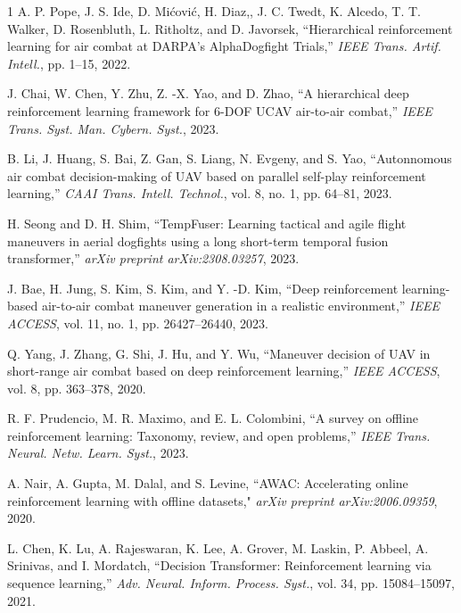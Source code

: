 \begin{thebibliography}{1}
    A. P. Pope, J. S. Ide, D. Mićović, H. Diaz,, J. C. Twedt, K. Alcedo, T. T. Walker, D. Rosenbluth, L. Ritholtz, and D. Javorsek, ``Hierarchical reinforcement learning for air combat at {DARPA}'s {AlphaDogfight Trials},'' \emph{IEEE Trans. Artif. Intell.}, pp. 1--15, 2022.

    J. Chai, W. Chen, Y. Zhu, Z. -X. Yao, and D. Zhao, ``A hierarchical deep reinforcement learning framework for 6-{DOF} {UCAV} air-to-air combat,'' \emph{IEEE Trans. Syst. Man. Cybern. Syst.}, 2023.

    B. Li, J. Huang, S. Bai, Z. Gan, S. Liang, N. Evgeny, and S. Yao, ``Autonnomous air combat decision-making of {UAV} based on parallel self-play reinforcement learning,'' \emph{CAAI Trans. Intell. Technol.}, vol. 8, no. 1, pp. 64--81, 2023.

    H. Seong and D. H. Shim, ``Temp{F}user: Learning tactical and agile flight maneuvers in aerial dogfights using a long short-term temporal fusion transformer,'' \emph{arXiv preprint arXiv:2308.03257}, 2023.

    J. Bae, H. Jung, S. Kim, S. Kim, and Y. -D. Kim, ``Deep reinforcement learning-based air-to-air combat maneuver generation in a realistic environment,'' \emph{IEEE ACCESS}, vol. 11, no. 1, pp. 26427--26440, 2023.

    Q. Yang, J. Zhang, G. Shi, J. Hu, and Y. Wu, ``Maneuver decision of {UAV} in short-range air combat based on deep reinforcement learning,'' \emph{IEEE ACCESS}, vol. 8, pp. 363--378, 2020.

    R. F. Prudencio, M. R. Maximo, and E. L. Colombini, ``A survey on offline reinforcement learning: Taxonomy, review, and open problems,'' \emph{IEEE Trans. Neural. Netw. Learn. Syst.}, 2023.

    A. Nair, A. Gupta, M. Dalal, and S. Levine, ``{AWAC}: Accelerating online reinforcement learning with offline datasets," \emph{arXiv preprint arXiv:2006.09359}, 2020.

    L. Chen, K. Lu, A. Rajeswaran, K. Lee, A. Grover, M. Laskin, P. Abbeel, A. Srinivas, and I. Mordatch, ``Decision Transformer: Reinforcement learning via sequence learning,'' \emph{Adv. Neural. Inform. Process. Syst.}, vol. 34, pp. 15084--15097, 2021.


\end{thebibliography}
